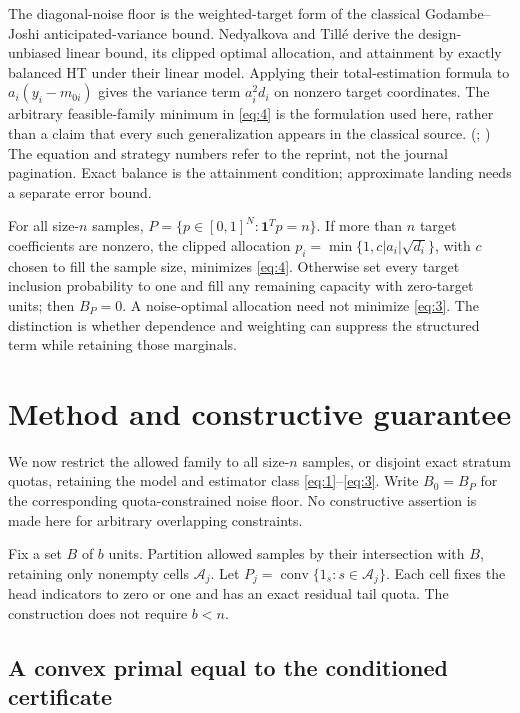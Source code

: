 \documentclass[11pt]{article}
\begin{document}
The diagonal-noise floor is the weighted-target form of the classical
Godambe--Joshi anticipated-variance bound. Nedyalkova and Tillé derive
the design-unbiased linear bound, its clipped optimal allocation, and
attainment by exactly balanced HT under their linear model. Applying
their total-estimation formula to \(a_i(y_i-m_{0i})\) gives the variance
term \(a_i^2d_i\) on nonzero target coordinates. The arbitrary
feasible-family minimum in \eqref{eq:4} is the formulation used here,
rather than a claim that every such generalization appears in the
classical source. (\citealp{GodambeJoshi1965};
\citealp[equation (2.9), Result 2.2, and Strategy 2.1]{NedyalkovaTille2008})
The equation and strategy numbers refer to the reprint, not the journal
pagination. Exact balance is the attainment condition; approximate
landing needs a separate error bound.

For all size-\(n\) samples, \(P=\{p\in[0,1]^N:\mathbf1^Tp=n\}\). If more
than \(n\) target coefficients are nonzero, the clipped allocation
\(p_i=\min\{1,c|a_i|\sqrt{d_i}\}\), with \(c\) chosen to fill the sample
size, minimizes \eqref{eq:4}. Otherwise set every target inclusion
probability to one and fill any remaining capacity with zero-target
units; then \(B_P=0\). A noise-optimal allocation need not minimize
\eqref{eq:3}. The distinction is whether dependence and weighting can
suppress the structured term while retaining those marginals.

\section{Method and constructive
guarantee}\label{method-and-constructive-guarantee}

We now restrict the allowed family to all size-\(n\) samples, or
disjoint exact stratum quotas, retaining the model and estimator class
\eqref{eq:1}--\eqref{eq:3}. Write \(B_0=B_P\) for the corresponding
quota-constrained noise floor. No constructive assertion is made here
for arbitrary overlapping constraints.

Fix a set \(B\) of \(b\) units. Partition allowed samples by their
intersection with \(B\), retaining only nonempty cells \(\mathcal A_j\).
Let \(P_j=\operatorname{conv}\{1_s:s\in\mathcal A_j\}\). Each cell fixes
the head indicators to zero or one and has an exact residual tail quota.
The construction does not require \(b<n\).

\subsection{A convex primal equal to the conditioned
certificate}\label{a-convex-primal-equal-to-the-conditioned-certificate}
\end{document}
